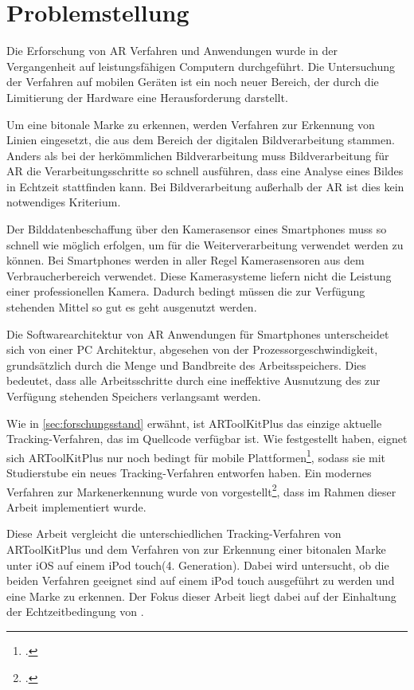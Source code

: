 \section{Problemstellung} %
\label{sec:problemstellung}
\begin{comment}
	Problemstellung: Problemstellung und Frage im Detail erläutern
\end{comment}

Die Erforschung von \gls{AR} Verfahren und Anwendungen wurde in der Vergangenheit auf leistungsfähigen Computern
 durchgeführt. Die Untersuchung der Verfahren auf mobilen Geräten ist ein noch neuer Bereich, der durch die Limitierung
 der Hardware eine Herausforderung darstellt.

Um eine bitonale Marke zu erkennen, werden Verfahren zur Erkennung von Linien eingesetzt, die aus dem Bereich der
 digitalen Bildverarbeitung stammen. Anders als bei der herkömmlichen Bildverarbeitung muss Bildverarbeitung für
 \gls{AR} die Verarbeitungsschritte so schnell ausführen, dass eine Analyse eines Bildes in Echtzeit stattfinden kann.
 Bei Bildverarbeitung außerhalb der \gls{AR} ist dies kein notwendiges Kriterium.

Der Bilddatenbeschaffung über den Kamerasensor eines Smartphones muss so schnell wie möglich erfolgen, um für die
 Weiterverarbeitung verwendet werden zu können. Bei Smartphones werden in aller Regel Kamerasensoren aus dem
 Verbraucherbereich verwendet. Diese Kamerasysteme liefern nicht die Leistung einer professionellen Kamera. Dadurch
 bedingt müssen die zur Verfügung stehenden Mittel so gut es geht ausgenutzt werden.

Die Softwarearchitektur von \gls{AR} Anwendungen für Smartphones unterscheidet sich von einer PC Architektur, abgesehen
 von der Prozessorgeschwindigkeit, grundsätzlich durch die Menge und Bandbreite des Arbeitsspeichers. Dies bedeutet,
 dass alle Arbeitsschritte durch eine ineffektive Ausnutzung des zur Verfügung stehenden Speichers verlangsamt werden.

Wie in \autoref{sec:forschungsstand} erwähnt, ist ARToolKitPlus das einzige aktuelle Tracking-Verfahren, das im
 Quellcode verfügbar ist. Wie \citeauthor{wagner09a} festgestellt haben, eignet sich ARToolKitPlus nur noch bedingt für
 mobile Plattformen\footcite{wagner09a}, sodass sie mit Studierstube ein neues Tracking-Verfahren entworfen haben. Ein
 modernes Verfahren zur Markenerkennung wurde von \citeauthor{hirzer08} vorgestellt\footcite{hirzer08}, dass im Rahmen
 dieser Arbeit implementiert wurde.

Diese Arbeit vergleicht die unterschiedlichen Tracking-Verfahren von ARToolKitPlus und dem Verfahren von
 \citeauthor{hirzer08} zur Erkennung einer bitonalen Marke unter iOS auf einem iPod
 touch\textregistered (4. Generation). Dabei wird untersucht, ob die beiden Verfahren geeignet sind auf einem iPod
 touch ausgeführt zu werden und eine Marke zu erkennen. Der Fokus dieser Arbeit liegt dabei auf der Einhaltung der
 Echtzeitbedingung von \citeauthor{azuma97}.

